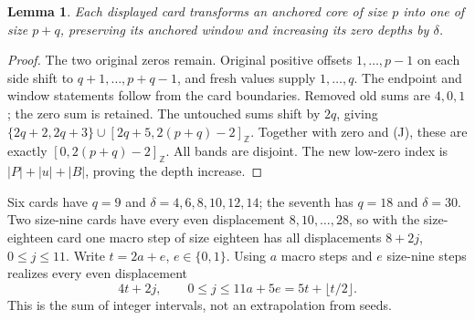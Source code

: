 \documentclass[11pt,a4paper]{article}
\newtheorem{lemma}[theorem]{Lemma}
\theoremstyle{definition}\newtheorem{definition}[theorem]{Definition}
\theoremstyle{remark}\newtheorem{remark}[theorem]{Remark}
\newcommand{\ints}[2]{[#1,#2]_{\mathbb Z}}
\begin{document}
\begin{lemma}\label{lem:insert}
Each displayed card transforms an anchored core of size $p$ into one of
size $p+q$, preserving its anchored window and increasing its zero depths
by $\delta$.
\end{lemma}
\begin{proof}
The two original zeros remain. Original positive offsets $1,\ldots,p-1$
on each side shift to $q+1,\ldots,p+q-1$, and fresh values supply
$1,\ldots,q$. The endpoint and window statements follow from the card
boundaries. Removed old sums are $4,0,1$; the zero sum is retained.
The untouched sums shift by $2q$, giving
$\{2q+2,2q+3\}\cup\ints{2q+5}{2(p+q)-2}$.
Together with zero and (J), these are exactly
$\ints0{2(p+q)-2}$. All bands are disjoint. The new low-zero index is
$|P|+|u|+|B|$, proving the depth increase.
\end{proof}
Six cards have $q=9$ and $\delta=4,6,8,10,12,14$; the seventh has
$q=18$ and $\delta=30$. Two size-nine cards have every even
displacement $8,10,\ldots,28$, so with the size-eighteen card one macro
step of size eighteen has all displacements $8+2j$, $0\le j\le11$.
Write $t=2a+e$, $e\in\{0,1\}$. Using $a$ macro steps and $e$
size-nine steps realizes every even displacement
\[
 4t+2j,\qquad 0\le j\le11a+5e=5t+\lfloor t/2\rfloor.  \tag{K}
\]
This is the sum of integer intervals, not an extrapolation from seeds.
\end{document}
